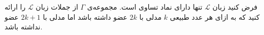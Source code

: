 فرض کنید زبان
$\mathcal{L}$
تنها دارای نماد تساوی است. مجموعه‌ی $\Gamma$ از جملات زبان $\mathcal{L}$ را ارائه کنید که به ازای هر عدد طبیعی $k$ مدلی با $2k$ عضو داشته باشد اما مدلی با $2k+1$ عضو نداشته باشد.
